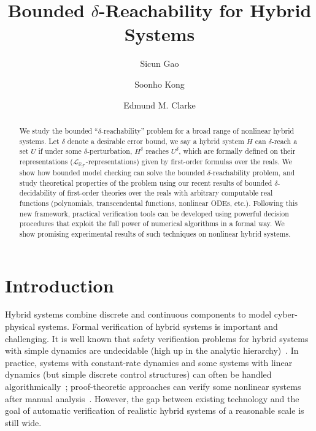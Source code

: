\documentclass[envcountsect]{llncs}
\title{Bounded $\delta$-Reachability for Hybrid Systems}
\author{Sicun Gao \and Soonho Kong \and Edmund M. Clarke}
\institute{Carnegie Mellon University, Pittsburgh, PA 15213}
\newcommand{\lrf}{\mathcal{L}_{\mathbb{R}_{\mathcal{F}}}}
\begin{document}
\maketitle

\begin{abstract}
We study the bounded ``$\delta$-reachability'' problem for a broad
range of nonlinear hybrid systems. Let $\delta$ denote
a desirable error bound, we say a hybrid system $H$ can $\delta$-reach a set
$U$ if under some $\delta$-perturbation, $H^{\delta}$ reaches
$U^{\delta}$, which are formally defined on their representations
($\lrf$-representations) given by first-order formulas over the reals. We show
how bounded model checking can solve the bounded $\delta$-reachability problem,
and study theoretical properties of the problem using our recent
results of bounded $\delta$-decidability of first-order theories over the reals
with arbitrary computable real functions (polynomials, transcendental functions,
nonlinear ODEs, etc.). Following this new framework, practical verification
tools can be developed using powerful decision procedures that exploit
the full power of numerical algorithms in a formal way. We show promising
experimental results of such techniques on nonlinear hybrid systems. 

\end{abstract}

\section{Introduction}

Hybrid systems combine discrete and continuous components to
model cyber-physical systems. Formal verification of hybrid systems is
important and challenging. It is well known that safety verification
problems for hybrid systems with simple dynamics are undecidable (high up in the
analytic
hierarchy)~\cite{DBLP:journals/tse/AlurHH96,DBLP:journals/jcss/HenzingerKPV98,DBLP:journals/tcs/Bournez99}. In practice, systems
with constant-rate dynamics
and some systems with linear dynamics (but simple discrete control structures)
can often be handled
algorithmically~\cite{DBLP:journals/tse/AlurHH96,lpw:sttt97,DBLP:conf/hybrid/ChutinanK99,DBLP:conf/hybrid/AsarinDMB00,DBLP:conf/cav/AsarinDM02,DBLP:conf/hybrid/GirardGM06,DBLP:conf/cav/GuernicG09}; proof-theoretic
approaches can verify some nonlinear systems after manual analysis~\cite{DBLP:journals/logcom/Platzer10,DBLP:conf/hybrid/Sankaranarayanan10}.
However, the gap between existing technology
and the goal of automatic verification of realistic hybrid systems of a
reasonable scale is still wide.
\end{document}
